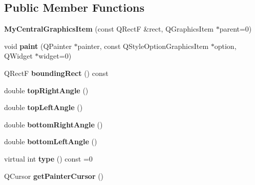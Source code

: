 \subsection*{Public Member Functions}
\begin{DoxyCompactItemize}
\item 
\hypertarget{class_my_central_graphics_item_aad8e57045bd2fa779167b03cc4d904f6}{}{\bfseries My\+Central\+Graphics\+Item} (const Q\+Rect\+F \&rect, Q\+Graphics\+Item $\ast$parent=0)\label{class_my_central_graphics_item_aad8e57045bd2fa779167b03cc4d904f6}

\item 
\hypertarget{class_my_central_graphics_item_a7f7865060c07eb7f53de607b96af4374}{}void {\bfseries paint} (Q\+Painter $\ast$painter, const Q\+Style\+Option\+Graphics\+Item $\ast$option, Q\+Widget $\ast$widget=0)\label{class_my_central_graphics_item_a7f7865060c07eb7f53de607b96af4374}

\item 
\hypertarget{class_my_central_graphics_item_a4b6fb53c59a68427af7b50d87e575b55}{}Q\+Rect\+F {\bfseries bounding\+Rect} () const \label{class_my_central_graphics_item_a4b6fb53c59a68427af7b50d87e575b55}

\item 
\hypertarget{class_my_central_graphics_item_afe51dd4af5f6a9f0d7f9724fd447cf15}{}double {\bfseries top\+Right\+Angle} ()\label{class_my_central_graphics_item_afe51dd4af5f6a9f0d7f9724fd447cf15}

\item 
\hypertarget{class_my_central_graphics_item_ab2e87f4e08a71e5457495777658f3acd}{}double {\bfseries top\+Left\+Angle} ()\label{class_my_central_graphics_item_ab2e87f4e08a71e5457495777658f3acd}

\item 
\hypertarget{class_my_central_graphics_item_a2f7682741d279d241f1918ce0481bf76}{}double {\bfseries bottom\+Right\+Angle} ()\label{class_my_central_graphics_item_a2f7682741d279d241f1918ce0481bf76}

\item 
\hypertarget{class_my_central_graphics_item_a00dac82c3de7ac8e4c82b6a67640fc96}{}double {\bfseries bottom\+Left\+Angle} ()\label{class_my_central_graphics_item_a00dac82c3de7ac8e4c82b6a67640fc96}

\item 
\hypertarget{class_my_central_graphics_item_a69d74fc2be942bba5724001725da7a20}{}virtual int {\bfseries type} () const =0\label{class_my_central_graphics_item_a69d74fc2be942bba5724001725da7a20}

\item 
\hypertarget{class_my_central_graphics_item_ab8c895264ea2bbfae7cd4be206450919}{}Q\+Cursor {\bfseries get\+Painter\+Cursor} ()\label{class_my_central_graphics_item_ab8c895264ea2bbfae7cd4be206450919}

\end{DoxyCompactItemize}
